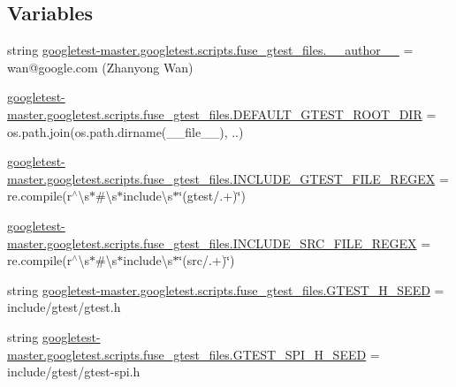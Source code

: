 \subsection*{Variables}
\begin{DoxyCompactItemize}
\item 
string \mbox{\hyperlink{namespacegoogletest-master_1_1googletest_1_1scripts_1_1fuse__gtest__files_aa5db7dacb4b013ac5763b8d0c6eccff0}{googletest-\/master.\+googletest.\+scripts.\+fuse\+\_\+gtest\+\_\+files.\+\_\+\+\_\+author\+\_\+\+\_\+}} = \textquotesingle{}wan@google.\+com (Zhanyong Wan)\textquotesingle{}
\item 
\mbox{\hyperlink{namespacegoogletest-master_1_1googletest_1_1scripts_1_1fuse__gtest__files_a687bc65c1d2f56fb86bc56bc61ad9f8f}{googletest-\/master.\+googletest.\+scripts.\+fuse\+\_\+gtest\+\_\+files.\+D\+E\+F\+A\+U\+L\+T\+\_\+\+G\+T\+E\+S\+T\+\_\+\+R\+O\+O\+T\+\_\+\+D\+IR}} = os.\+path.\+join(os.\+path.\+dirname(\+\_\+\+\_\+file\+\_\+\+\_\+), \textquotesingle{}..\textquotesingle{})
\item 
\mbox{\hyperlink{namespacegoogletest-master_1_1googletest_1_1scripts_1_1fuse__gtest__files_aaca3d9c1f77ee70bf3d1c19d08e1fc10}{googletest-\/master.\+googletest.\+scripts.\+fuse\+\_\+gtest\+\_\+files.\+I\+N\+C\+L\+U\+D\+E\+\_\+\+G\+T\+E\+S\+T\+\_\+\+F\+I\+L\+E\+\_\+\+R\+E\+G\+EX}} = re.\+compile(r\textquotesingle{}$^\wedge$\textbackslash{}s$\ast$\#\textbackslash{}s$\ast$include\textbackslash{}s$\ast$\char`\"{}(gtest/.+)\char`\"{}\textquotesingle{})
\item 
\mbox{\hyperlink{namespacegoogletest-master_1_1googletest_1_1scripts_1_1fuse__gtest__files_a57b2ebda3188c3f3eedd7ae9e5aa323d}{googletest-\/master.\+googletest.\+scripts.\+fuse\+\_\+gtest\+\_\+files.\+I\+N\+C\+L\+U\+D\+E\+\_\+\+S\+R\+C\+\_\+\+F\+I\+L\+E\+\_\+\+R\+E\+G\+EX}} = re.\+compile(r\textquotesingle{}$^\wedge$\textbackslash{}s$\ast$\#\textbackslash{}s$\ast$include\textbackslash{}s$\ast$\char`\"{}(src/.+)\char`\"{}\textquotesingle{})
\item 
string \mbox{\hyperlink{namespacegoogletest-master_1_1googletest_1_1scripts_1_1fuse__gtest__files_ad165cb05e43b8249a2bc2b12e2900814}{googletest-\/master.\+googletest.\+scripts.\+fuse\+\_\+gtest\+\_\+files.\+G\+T\+E\+S\+T\+\_\+\+H\+\_\+\+S\+E\+ED}} = \textquotesingle{}include/gtest/gtest.\+h\textquotesingle{}
\item 
string \mbox{\hyperlink{namespacegoogletest-master_1_1googletest_1_1scripts_1_1fuse__gtest__files_ae5223d71181009f26c5585f06d7505fb}{googletest-\/master.\+googletest.\+scripts.\+fuse\+\_\+gtest\+\_\+files.\+G\+T\+E\+S\+T\+\_\+\+S\+P\+I\+\_\+\+H\+\_\+\+S\+E\+ED}} = \textquotesingle{}include/gtest/gtest-\/spi.\+h\textquotesingle{}

\end{DoxyCompactItemize}
